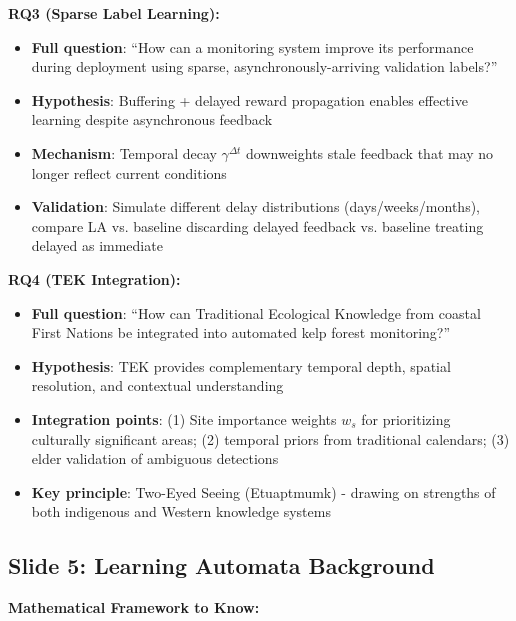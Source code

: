 \documentclass[11pt]{article}
\begin{document}
\textbf{RQ3 (Sparse Label Learning):}
\begin{itemize}
    \item \textbf{Full question}: ``How can a monitoring system improve its performance during deployment using sparse, asynchronously-arriving validation labels?''
    \item \textbf{Hypothesis}: Buffering + delayed reward propagation enables effective learning despite asynchronous feedback
    \item \textbf{Mechanism}: Temporal decay $\gamma^{\Delta t}$ downweights stale feedback that may no longer reflect current conditions
    \item \textbf{Validation}: Simulate different delay distributions (days/weeks/months), compare LA vs. baseline discarding delayed feedback vs. baseline treating delayed as immediate
\end{itemize}

\textbf{RQ4 (TEK Integration):}
\begin{itemize}
    \item \textbf{Full question}: ``How can Traditional Ecological Knowledge from coastal First Nations be integrated into automated kelp forest monitoring?''
    \item \textbf{Hypothesis}: TEK provides complementary temporal depth, spatial resolution, and contextual understanding
    \item \textbf{Integration points}: (1) Site importance weights $w_s$ for prioritizing culturally significant areas; (2) temporal priors from traditional calendars; (3) elder validation of ambiguous detections
    \item \textbf{Key principle}: Two-Eyed Seeing (Etuaptmumk) - drawing on strengths of both indigenous and Western knowledge systems
\end{itemize}

\subsection{Slide 5: Learning Automata Background}

\textbf{Mathematical Framework to Know:}
\end{document}
